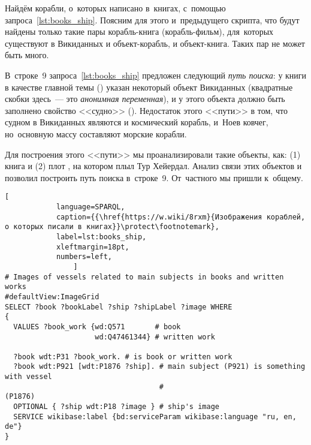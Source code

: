 \begin{task}
Найдём корабли, о~которых написано в~книгах, с~помощью запроса~\ref{lst:books_ship}. 
    Поясним для этого и~предыдущего скрипта, 
    что будут найдены только такие пары корабль-книга (корабль-фильм), 
    для~которых существуют в Викиданных и объект-корабль, и объект-книга. 
    Таких пар не может быть много. 


    В~строке~9 запроса~\ref{lst:books_ship} предложен следующий \emph{путь поиска}: 
    у книги в качестве главной темы () 
    указан некоторый объект Викиданных (квадратные скобки здесь~--- это \emph{анонимная переменная}), 
    и у этого объекта должно быть заполнено свойство <<судно>> (). 
    Недостаток этого <<пути>> в том, что судном в Викиданных являются и космический корабль, и~Ноев ковчег, 
    но~основную массу составляют морские корабли. 

    Для построения этого <<пути>> мы проанализировали такие объекты, как: 
    (1) книга  
    и (2) плот , на котором плыл Тур Хейердал. 
    Анализ связи этих объектов и позволил построить путь поиска в~строке~9. 
    От~частного мы пришли к~общему. 

\begin{lstlisting}[ 
            language=SPARQL, 
            caption={{\href{https://w.wiki/8rxm}{Изображения кораблей, о которых писали в книгах}}\protect\footnotemark}, 
            label=lst:books_ship, 
            xleftmargin=18pt, 
            numbers=left,
                ]
# Images of vessels related to main subjects in books and written works
#defaultView:ImageGrid
SELECT ?book ?bookLabel ?ship ?shipLabel ?image WHERE
{
  VALUES ?book_work {wd:Q571       # book
                     wd:Q47461344} # written work
  
  ?book wdt:P31 ?book_work. # is book or written work  
  ?book wdt:P921 [wdt:P1876 ?ship]. # main subject (P921) is something with vessel 
                                    #                                      (P1876)
  OPTIONAL { ?ship wdt:P18 ?image } # ship's image
  SERVICE wikibase:label {bd:serviceParam wikibase:language "ru, en, de"}
}
\end{lstlisting}
\end{task}






